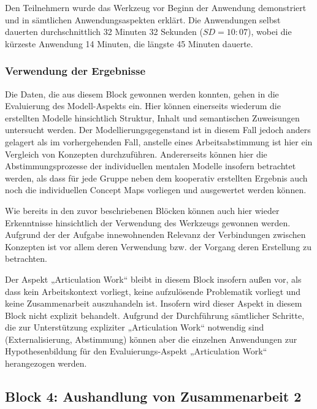 Den Teilnehmern wurde das Werkzeug vor Beginn der Anwendung demonstriert und in sämtlichen Anwendungsaspekten erklärt. Die Anwendungen selbst dauerten durchschnittlich 32 Minuten 32 Sekunden ($SD=10:07$), wobei die kürzeste Anwendung 14 Minuten, die längste 45 Minuten dauerte.

\subsubsection{Verwendung der Ergebnisse} %
\label{ssub:3_verwendung_der_ergebnisse}

Die Daten, die aus diesem Block gewonnen werden konnten, gehen in die Evaluierung des Modell-Aspekts ein. Hier können einerseits wiederum die erstellten Modelle hinsichtlich Struktur, Inhalt und semantischen Zuweisungen untersucht werden. Der Modellierungsgegenstand ist in diesem Fall jedoch anders gelagert als im vorhergehenden Fall, anstelle eines Arbeitsabstimmung ist hier ein Vergleich von Konzepten durchzuführen. Andererseits können hier die Abstimmungsprozesse der individuellen mentalen Modelle insofern betrachtet werden, als dass für jede Gruppe neben dem kooperativ erstellten Ergebnis auch noch die individuellen Concept Maps vorliegen und ausgewertet werden können.

Wie bereits in den zuvor beschriebenen Blöcken können auch hier wieder Erkenntnisse hinsichtlich der Verwendung des Werkzeugs gewonnen werden. Aufgrund der der Aufgabe innewohnenden Relevanz der Verbindungen zwischen Konzepten ist vor allem deren Verwendung bzw. der Vorgang deren Erstellung zu betrachten.

Der Aspekt „Articulation Work“ bleibt in diesem Block insofern außen vor, als dass kein Arbeitskontext vorliegt, keine aufzulösende Problematik vorliegt und keine Zusammenarbeit auszuhandeln ist. Insofern wird dieser Aspekt in diesem Block nicht explizit behandelt. Aufgrund der Durchführung sämtlicher Schritte, die zur Unterstützung expliziter „Articulation Work“ notwendig sind (Externalisierung, Abstimmung) können aber die einzelnen Anwendungen zur Hypothesenbildung für den Evaluierungs-Aspekt „Articulation Work“ herangezogen werden.


\subsection{Block 4: Aushandlung von Zusammenarbeit 2}
\label{sub:eval_4}

